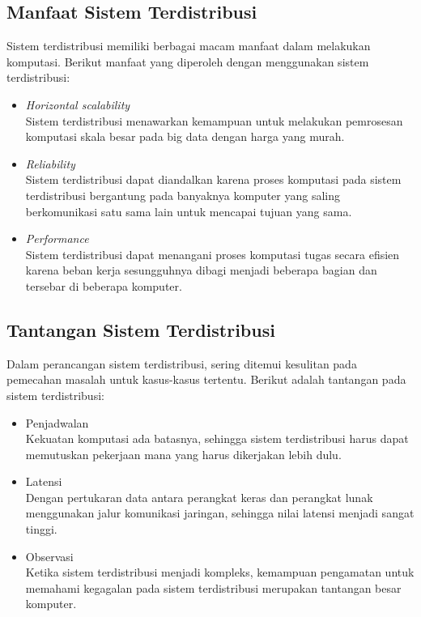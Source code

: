 \subsection{Manfaat Sistem Terdistribusi}
Sistem terdistribusi memiliki berbagai macam manfaat dalam melakukan komputasi. Berikut manfaat yang diperoleh dengan menggunakan sistem terdistribusi:

\begin{itemize}
\item \textit{Horizontal scalability}\\
Sistem terdistribusi menawarkan kemampuan untuk melakukan pemrosesan komputasi skala besar pada big data dengan harga yang murah.

\item \textit{Reliability}\\
Sistem terdistribusi dapat diandalkan karena proses komputasi pada sistem terdistribusi bergantung pada banyaknya komputer yang saling berkomunikasi satu sama lain untuk mencapai tujuan yang sama.
 
\item \textit{Performance}\\
Sistem terdistribusi dapat menangani proses komputasi tugas secara efisien karena beban kerja sesungguhnya dibagi menjadi beberapa bagian dan tersebar di beberapa komputer. 
\end{itemize}

\subsection{Tantangan Sistem Terdistribusi} 
Dalam perancangan sistem terdistribusi, sering ditemui kesulitan pada pemecahan masalah untuk kasus-kasus tertentu. Berikut adalah tantangan pada sistem terdistribusi:

\begin{itemize}
\item Penjadwalan\\
Kekuatan komputasi ada batasnya, sehingga sistem terdistribusi harus dapat memutuskan pekerjaan mana yang harus dikerjakan lebih dulu.
\item Latensi\\
Dengan pertukaran data antara perangkat keras dan perangkat lunak menggunakan jalur komunikasi jaringan, sehingga nilai latensi menjadi sangat tinggi. 
\item Observasi\\
Ketika sistem terdistribusi menjadi kompleks, kemampuan pengamatan untuk memahami kegagalan pada sistem terdistribusi merupakan tantangan besar komputer. 
\end{itemize}

